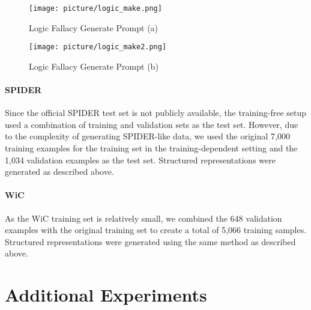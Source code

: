 \begin{figure}[ht]
\centering
\vspace{0in}
\texttt{[image: picture/logic\_make.png]}
\caption{Logic Fallacy Generate Prompt (a)}
\label{fig:makr_lfs_a}
\vspace{-0.1in}
\end{figure}

\begin{figure}[ht]
\centering
\vspace{0in}
\texttt{[image: picture/logic\_make2.png]}
\caption{Logic Fallacy Generate Prompt (b)}
\label{fig:makr_lfs_b}
\vspace{-0.1in}
\end{figure}

\paragraph{SPIDER}
Since the official SPIDER test set is not publicly available, the training-free setup used a combination of training and validation sets as the test set. However, due to the complexity of generating SPIDER-like data, we used the original 7,000 training examples for the training set in the training-dependent setting and the 1,034 validation examples as the test set. Structured representations were generated as described above.

\paragraph{WiC}
As the WiC training set is relatively small, we combined the 648 validation examples with the original training set to create a total of 5,066 training samples. Structured representations were generated using the same method as described above.







\section{Additional Experiments}
